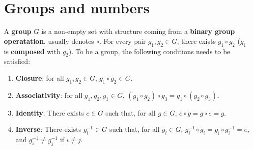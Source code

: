 \documentclass[letter-paper]{tufte-book}
\newcommand\Def[1]{\textbf{#1}}
\begin{document}

\chapter{Groups and numbers}

A \Def{group} $G$ is a non-empty set with structure coming from a \Def{binary
group operatation}, usually denotes $\circ$. For every pair $g_1, g_2 \in G$,
there exists $g_1 \circ g_2$ ($g_1$ is \Def{composed} with $g_2$). To be a
group, the following conditions needs to be satisfied:
\begin{enumerate}
	\item \Def{Closure}: for all $g_1, g_2 \in G$, $g_1 \circ g_2 \in G$.
	\item \Def{Associativity}: for all $g_1, g_2, g_3 \in G$, $(g_1 \circ
	g_2) \circ g_3 = g_1 \circ (g_2 \circ g_3)$.
	\item \Def{Identity}: There exists $e\in G$ such that, for all $g\in G$,
	$e\circ g = g\circ e = g$.
	\item \Def{Inverse}: There exists $g_i^{-1}\in G$ such that, for all
	$g_i \in G$, $g_i^{-1} \circ g_i = g_i \circ g_i^{-1}=e$, and $g_i^{-1}\neq
	g_j^{-1}$ if $i\neq j$.
\end{enumerate}
\end{document}
